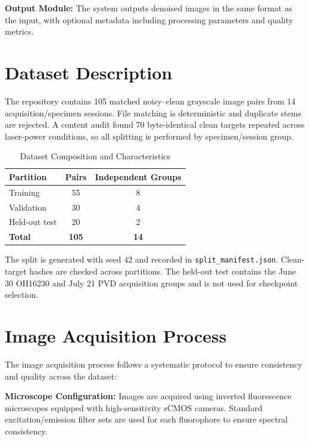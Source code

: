 \documentclass[12pt,a4paper]{report}
\begin{document}
\vspace{0.5cm}

\textbf{Output Module:} The system outputs denoised images in the same format as the input, with optional metadata including processing parameters and quality metrics.

\section{Dataset Description}

The repository contains 105 matched noisy--clean grayscale image pairs from 14 acquisition/specimen sessions. File matching is deterministic and duplicate stems are rejected. A content audit found 70 byte-identical clean targets repeated across laser-power conditions, so all splitting is performed by specimen/session group.

\vspace{0.5cm}

\begin{table}[H]
\centering
\caption{Dataset Composition and Characteristics}
\label{tab:dataset}
\begin{tabular}{|l|c|c|}
\hline
\textbf{Partition} & \textbf{Pairs} & \textbf{Independent Groups} \\
\hline
Training & 55 & 8 \\
Validation & 30 & 4 \\
Held-out test & 20 & 2 \\
\hline
\textbf{Total} & \textbf{105} & \textbf{14} \\
\hline
\end{tabular}
\end{table}

The split is generated with seed 42 and recorded in \texttt{split\_manifest.json}. Clean-target hashes are checked across partitions. The held-out test contains the June 30 OH16230 and July 21 PVD acquisition groups and is not used for checkpoint selection.

\section{Image Acquisition Process}

The image acquisition process follows a systematic protocol to ensure consistency and quality across the dataset:

\vspace{0.5cm}

\textbf{Microscope Configuration:} Images are acquired using inverted fluorescence microscopes equipped with high-sensitivity sCMOS cameras. Standard excitation/emission filter sets are used for each fluorophore to ensure spectral consistency.
\end{document}
